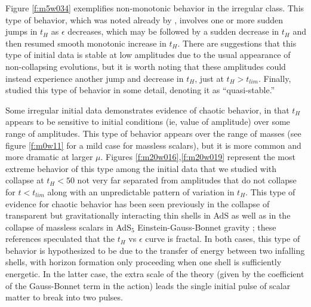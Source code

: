 \documentclass[../PhD.tex]{subfiles}
\begin{document}
Figure \ref{f:m5w034} exemplifies non-monotonic behavior in the irregular
class.  This type of behavior, which was noted already by \cite{1304.4166},
involves one or more sudden jumps in $t_H$ as $\epsilon$ decreases,
which may be followed by a sudden decrease in $t_H$ and then resumed smooth
monotonic increase in $t_H$.  There are suggestions that this type of
initial data is stable at low amplitudes due to the usual appearance of
non-collapsing evolutions, but it is worth noting that these amplitudes could
instead experience another jump and decrease in $t_H$, just at $t_H>t_{lim}$.
Finally, \cite{1508.02709} studied this type of behavior in some detail,
denoting it as ``quasi-stable.''

Some irregular initial data demonstrates evidence of chaotic behavior,
in that $t_H$ appears to be sensitive to initial conditions 
(ie, value of amplitude) over some range of amplitudes. 
This type of behavior appears over the range
of masses (see figure \ref{f:m0w11} for a mild case for massless scalars),
but it
is more common and more dramatic at larger $\mu$. Figures
\ref{f:m20w016},\ref{f:m20w019} represent the most extreme behavior of
this type
among the initial data that we studied with collapse at $t_H<50$ not very
far separated from amplitudes that do not collapse for $t<t_{lim}$ along with
an unpredictable pattern of variation in $t_H$.  This type of 
evidence for chaotic behavior
has been seen previously in the collapse of transparent but gravitationally
interacting thin shells in AdS \cite{1602.03535} as well as in the
collapse of massless scalars in AdS$_5$ Einstein-Gauss-Bonnet gravity
\cite{1410.1869,1608.05402}; these references speculated that the 
$t_H$ vs $\epsilon$ curve is fractal. In both cases, this type of behavior is
hypothesized to be due to the transfer of energy between two infalling shells,
with horizon formation only proceeding when one shell is sufficiently
energetic.  In the latter case, the extra scale of the theory
(given by the coefficient of the Gauss-Bonnet term in the action) leads the
single initial pulse of scalar matter to break into two pulses.
\end{document}
